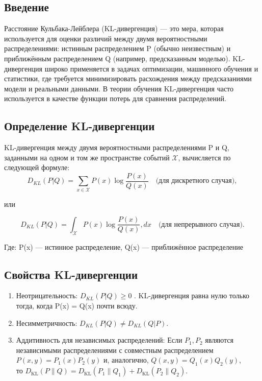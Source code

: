 \subsection*{Введение}
Расстояние Кульбака-Лейблера (KL-дивергенция) — это мера, которая используется для оценки различий между двумя вероятностными распределениями: истинным распределением P (обычно неизвестным) и приближённым распределением Q  (например, предсказанным моделью). KL-дивергенция широко применяется в задачах оптимизации, машинного обучения и статистики, где требуется минимизировать расхождения между предсказаниями модели и реальными данными. В теории обучения KL-дивергенция часто используется в качестве функции потерь для сравнения распределений.

\subsection*{Определение KL-дивергенции}

KL-дивергенция между двумя вероятностными распределениями  P и Q, заданными на одном и том же пространстве событий $\mathcal{X}$, вычисляется по следующей формуле:
\[
D_{KL}(P | Q) = \sum_{x \in \mathcal{X}} P(x) \log \frac{P(x)}{Q(x)} \quad \text{(для дискретного случая)},
\]

или

\[
D_{KL}(P | Q) = \int_{\mathcal{X}} P(x) \log \frac{P(x)}{Q(x)} , dx \quad \text{(для непрерывного случая)}.
\]

Где:
    P(x) — истинное распределение,
    Q(x) — приближённое распределение

\subsection*{Свойства KL-дивергенции}
\begin{enumerate}
    \item Неотрицательность: $ D_{KL}(P | Q) \geq 0 $ . KL-дивергенция равна нулю только тогда, когда P(x) = Q(x)  почти всюду.
    \item Несимметричность: $ D_{KL}(P | Q) \neq D_{KL}(Q | P) $.
    \item Аддитивность для независимых распределений:
     Если $\displaystyle P_{1},P_{2}$ являются независимыми распределениями с совместным распределением $\displaystyle P(x,y)=P_{1}(x)P_{2}(y)$ и, аналогично, $\displaystyle Q(x,y)=Q_{1}(x)Q_{2}(y)$,\\ то $\displaystyle D_{\mathrm {KL} }(P\parallel Q)=D_{\mathrm {KL} }(P_{1}\parallel Q_{1})+D_{\mathrm {KL} }(P_{2}\parallel Q_{2}).$
\end{enumerate}


